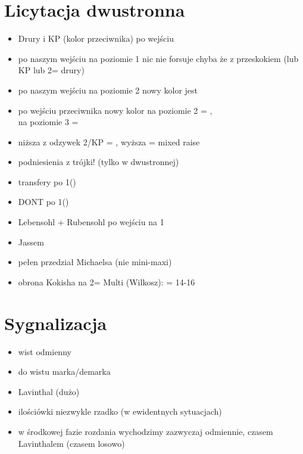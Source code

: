 \documentclass[12pt, a4paper]{report}
\begin{document}
{    \section*{\colorbox{blue!30}{Licytacja dwustronna}}
    \begin{itemize}
        \item Drury i KP (kolor przeciwnika) po wejściu
        \item po naszym wejściu na poziomie 1 nic nie forsuje chyba
        że z przeskokiem (lub KP lub 2\clubs = drury)
        \item po naszym wejściu na poziomie 2 nowy kolor jest \nf
        \item po wejściu przeciwnika nowy kolor na poziomie 2 = \nf,\\
        na poziomie 3 = \gf
        \item niższa z odzywek 2\nt/KP = \invp, wyższa = mixed raise
        \item podniesienia z trójki! (tylko w dwustronnej)
        \item transfery po 1\major (\dbl)
        \item DONT po 1\nt (\dbl)
        \item Lebensohl + Rubensohl po wejściu na 1\nt
        \item Jassem
        \item pełen przedział Michaelsa (nie mini-maxi)
        \item obrona Kokisha na 2\diams = Multi (Wilkosz): \dbl = 14-16 \bal
    \end{itemize}

    \section*{\colorbox{blue!30}{Sygnalizacja}}
    \begin{itemize}
        \item wist odmienny
        \item do wistu marka/demarka
        \item Lavinthal (dużo)
        \item ilościówki niezwykle rzadko (w ewidentnych sytuacjach)
        \item w środkowej fazie rozdania wychodzimy zazwyczaj odmiennie,
        czasem Lavinthalem (czasem losowo)
    \end{itemize}

}
\end{document}
